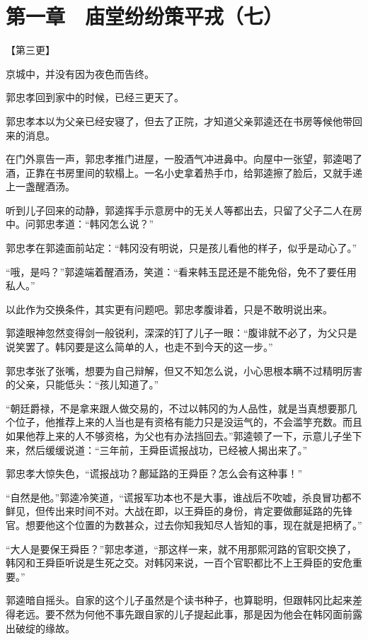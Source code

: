 \section{第一章　庙堂纷纷策平戎（七）}

【第三更】

京城中，并没有因为夜色而告终。

郭忠孝回到家中的时候，已经三更天了。

郭忠孝本以为父亲已经安寝了，但去了正院，才知道父亲郭逵还在书房等候他带回来的消息。

在门外禀告一声，郭忠孝推门进屋，一股酒气冲进鼻中。向屋中一张望，郭逵喝了酒，正靠在书房里间的软榻上。一名小史拿着热手巾，给郭逵擦了脸后，又就手递上一盏醒酒汤。

听到儿子回来的动静，郭逵挥手示意房中的无关人等都出去，只留了父子二人在房中。问郭忠孝道：“韩冈怎么说？”

郭忠孝在郭逵面前站定：“韩冈没有明说，只是孩儿看他的样子，似乎是动心了。”

“哦，是吗？”郭逵端着醒酒汤，笑道：“看来韩玉昆还是不能免俗，免不了要任用私人。”

以此作为交换条件，其实更有问题吧。郭忠孝腹诽着，只是不敢明说出来。

郭逵眼神忽然变得剑一般锐利，深深的钉了儿子一眼：“腹诽就不必了，为父只是说笑罢了。韩冈要是这么简单的人，也走不到今天的这一步。”

郭忠孝张了张嘴，想要为自己辩解，但又不知怎么说，小心思根本瞒不过精明厉害的父亲，只能低头：“孩儿知道了。”

“朝廷爵禄，不是拿来跟人做交易的，不过以韩冈的为人品性，就是当真想要那几个位子，他推荐上来的人当也是有资格有能力只是没运气的，不会滥竽充数。而且如果他荐上来的人不够资格，为父也有办法挡回去。”郭逵顿了一下，示意儿子坐下来，然后缓缓说道：“三年前，王舜臣谎报战功，已经被人揭出来了。”

郭忠孝大惊失色，“谎报战功？鄜延路的王舜臣？怎么会有这种事！”

“自然是他。”郭逵冷笑道，“谎报军功本也不是大事，谁战后不吹嘘，杀良冒功都不鲜见，但传出来时间不对。大战在即，以王舜臣的身份，肯定要做鄜延路的先锋官。想要他这个位置的为数甚众，过去你知我知尽人皆知的事，现在就是把柄了。”

“大人是要保王舜臣？”郭忠孝道，“那这样一来，就不用那熙河路的官职交换了，韩冈和王舜臣听说是生死之交。对韩冈来说，一百个官职都比不上王舜臣的安危重要。”

郭逵暗自摇头。自家的这个儿子虽然是个读书种子，也算聪明，但跟韩冈比起来差得老远。要不然为何他不事先跟自家的儿子提起此事，那是因为他会在韩冈面前露出破绽的缘故。

